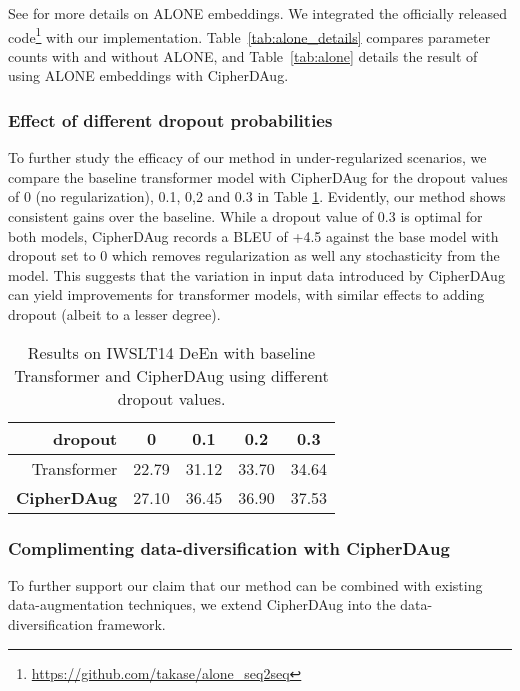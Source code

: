 \documentclass[11pt]{article}
\begin{document}
See \citet{alone-neurips20} for more details on ALONE embeddings. We integrated the officially released code\footnote{\url{https://github.com/takase/alone\_seq2seq}} with our implementation. Table~\ref{tab:alone_details} compares parameter counts with and without ALONE, and Table~\ref{tab:alone} details the result of using ALONE embeddings with CipherDAug.



\subsubsection{Effect of different dropout probabilities}
To further study the efficacy of our method in under-regularized scenarios, we compare the baseline transformer model with CipherDAug for the dropout values of 0 (no regularization), 0.1, 0,2 and 0.3 in Table \ref{tab:dropout_compare}. Evidently, our method shows consistent gains over the baseline. While a dropout value of 0.3 is optimal for both models, CipherDAug records a BLEU of +4.5 against the base model with dropout set to 0 which removes regularization as well any stochasticity from the model. 
This suggests that the variation in input data introduced by CipherDAug can yield improvements for transformer models, with similar effects to adding dropout (albeit to a lesser degree).

\begin{table}[ht]
\small
\centering
\begin{tabular}{rcccc}
\toprule
\textbf{dropout } & \textbf{0} & \textbf{0.1} & \textbf{0.2} & \textbf{0.3} \\ \midrule
Transformer & 22.79 & 31.12 & 33.70 & 34.64 \\
\textbf{CipherDAug} & 27.10 & 36.45 & 36.90 & 37.53 \\
\bottomrule
\end{tabular}
\caption{Results on IWSLT14 DeEn with baseline Transformer and CipherDAug using different dropout values.}
\label{tab:dropout_compare}
\end{table}

\subsubsection{Complimenting data-diversification with CipherDAug}\label{sec:data-diverse-combine}
To further support our claim that our method can be combined with existing data-augmentation techniques, we extend CipherDAug into the data-diversification \cite{nguyen19datadiverse} framework.
\end{document}
